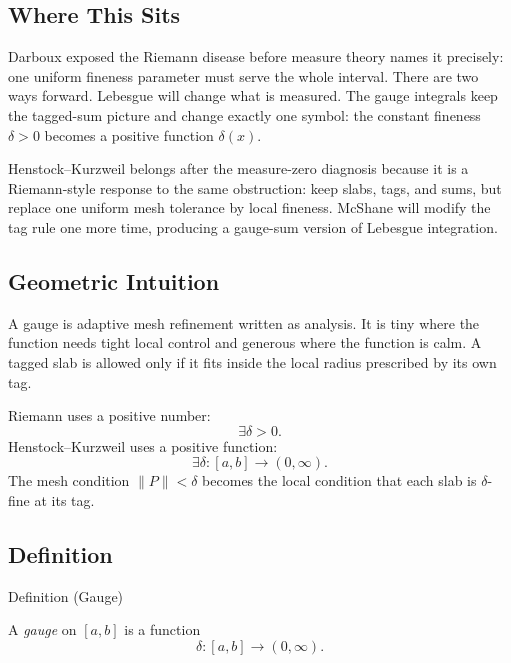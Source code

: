 \subsection*{Where This Sits}

\begin{exposition}
Darboux exposed the Riemann disease before measure theory names it precisely:
one uniform fineness parameter must serve the whole interval. There are two
ways forward. Lebesgue will change what is measured. The gauge integrals keep
the tagged-sum picture and change exactly one symbol: the constant fineness
\(\delta>0\) becomes a positive function \(\delta(x)\).
\end{exposition}

\begin{remark*}[Interpretation]
Henstock--Kurzweil belongs after the measure-zero diagnosis because it is a
Riemann-style response to the same obstruction: keep slabs, tags, and sums,
but replace one uniform mesh tolerance by local fineness. McShane will modify
the tag rule one more time, producing a gauge-sum version of Lebesgue
integration.
\end{remark*}

\subsection*{Geometric Intuition}

\begin{exposition}
A gauge is adaptive mesh refinement written as analysis. It is tiny where the
function needs tight local control and generous where the function is calm. A
tagged slab is allowed only if it fits inside the local radius prescribed by
its own tag.
\end{exposition}

\begin{remark*}[Interpretation]
Riemann uses a positive number:
\[
  \exists\delta>0.
\]
Henstock--Kurzweil uses a positive function:
\[
  \exists\delta:[a,b]\to(0,\infty).
\]
The mesh condition \(\|P\|<\delta\) becomes the local condition that each slab
is \(\delta\)-fine at its tag.
\end{remark*}

\subsection*{Definition}

\begin{definitionbox}{Definition (Gauge)}
\begin{definition}
\label{def:gauge-on-interval}
A \emph{gauge} on \([a,b]\) is a function
\[
  \delta:[a,b]\to(0,\infty).
\]
\end{definition}
\end{definitionbox}

